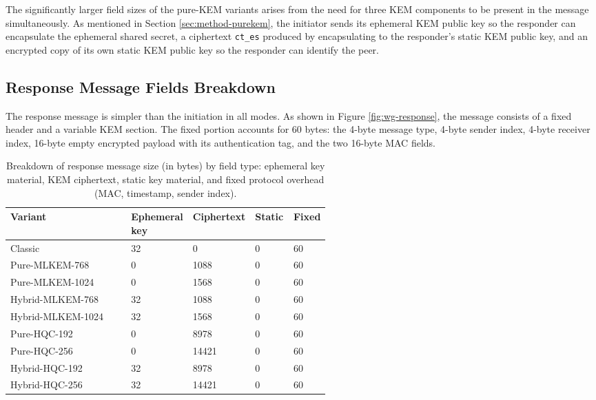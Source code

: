 The significantly larger field sizes of the pure-KEM variants arises from the need for three KEM components to be present in the message simultaneously. As mentioned in Section \ref{sec:method-purekem}, the initiator sends its ephemeral KEM public key so the responder can encapsulate the ephemeral shared secret, a ciphertext \texttt{ct\_es} produced by encapsulating to the responder's static KEM public key, and an encrypted copy of its own static KEM public key so the responder can identify the peer. 

\subsection{Response Message Fields Breakdown}

The response message is simpler than the initiation in all modes. As shown in Figure \ref{fig:wg-response}, the message consists of a fixed header and a variable KEM section. The fixed portion accounts for 60 bytes: the 4-byte message type, 4-byte sender index, 4-byte receiver index, 16-byte empty encrypted payload with its authentication tag, and the two 16-byte MAC fields.

\begin{table}[H]
\centering
\begin{tabular}{|l|R{0.18\linewidth}R{0.14\linewidth}R{0.12\linewidth}R{0.1\linewidth}|}
\hline
\textbf{Variant} & Ephemeral key & Ciphertext & Static & Fixed \\
\hline
Classic           & 32    & 0     & 0  & 60 \\
Pure-MLKEM-768    & 0     & 1088  & 0  & 60 \\
Pure-MLKEM-1024   & 0     & 1568  & 0  & 60 \\
Hybrid-MLKEM-768  & 32    & 1088  & 0  & 60 \\
Hybrid-MLKEM-1024 & 32    & 1568  & 0  & 60 \\
Pure-HQC-192      & 0     & 8978  & 0  & 60 \\
Pure-HQC-256      & 0     & \num{14421} & 0  & 60 \\
Hybrid-HQC-192    & 32    & 8978  & 0  & 60 \\
Hybrid-HQC-256    & 32    & \num{14421} & 0  & 60 \\
\hline
\end{tabular}
\caption{Breakdown of response message size (in bytes) by field type: ephemeral key material, KEM ciphertext, static key material, and fixed protocol overhead (MAC, timestamp, sender index).}
\label{tab:ResponseMessageBreakdown}
\end{table}


